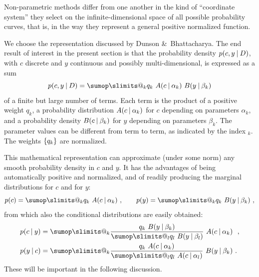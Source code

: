 \documentclass[\ifafour a4paper,12pt,\else a5paper,10pt,\fi%
onecolumn,oneside,article,%
british%
]{memoir}
\makeatletter
\theoremstyle{remark}
\theoremstyle{innote}
\def\sum{\DOTSI\sumop\slimits@}
\newcommand*{\amp}{\&}
\DeclarePairedDelimiter\set{\{}{\}} %
\renewcommand*{\|}[1][]{\nonscript\:#1\vert\nonscript\:\mathopen{}}
\makeatother
\begin{document}
Non-parametric methods differ from one another in the kind of \enquote{coordinate system} they select on the infinite-dimensional space of all possible probability curves, that is, in the way they represent a general positive normalized function.

We choose the representation discussed by Dunson \amp\ Bhattacharya\autocites{dunsonetal2011}[see also the special case presented by][]{rasmussen1999}. The end result of interest in the present section is that the probability density $p(c,y \| D)$, with $c$ discrete and $y$ continuous and possibly multi-dimensional, is expressed as a sum
\begin{equation}
  \label{eq:representation_P}
  p(c, y \| D) = \sum_{k} q_{k}\ A(c \| \alpha_{k})\ B(y \| \beta_{k})
\end{equation}
of a finite but large number of terms. Each term is the product of a positive weight $q_{k}$, a probability distribution $A(c \| \alpha_{k})$ for $c$ depending on parameters $\alpha_{k}$, and a probability density $B(c \| \beta_{k})$ for $y$ depending on parameters $\beta_{k}$. The parameter values can be different from term to term, as indicated by the index ${}_{k}$. The weights $\set{q_{k}}$ are normalized.

This mathematical representation can approximate (under some norm) any smooth probability density in $c$ and $y$. It has the advantages of being automatically positive and normalized, and of readily producing the marginal distributions for $c$ and for $y$:
\begin{equation}
  \label{eq:marginals}
  p(c) = \sum_{k} q_{k}\ A(c \| \alpha_{k})\ ,
  \qquad
  p(y) = \sum_{k} q_{k}\ B(y \| \beta_{k}) \ ,
\end{equation}
from which also the conditional distributions are easily obtained:
\begin{subequations} \label{eq:conditionals}
  \begin{align}
    \label{eq:conditional_c_given_y}
    p(c \| y) &= \sum_{k} \frac{q_{k}\ B(y \| \beta_{k})
                }{\sum_{l} q_{l}\ B(y \| \beta_{l})}\
                A(c \| \alpha_{k})\  \ ,
    \\
    \label{eq:conditional_y_given_c}
    p(y \| c) &= \sum_{k} \frac{q_{k}\ A(c \| \alpha_{k})
                }{\sum_{l} q_{l}\ A(c \| \alpha_{l})}\
                B(y \| \beta_{k}) \ .
  \end{align}
\end{subequations}
These will be important in the following discussion.
\end{document}

